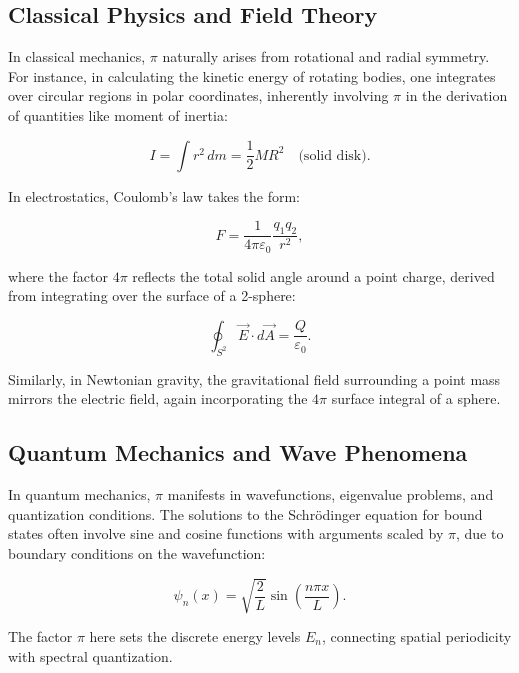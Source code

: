 \documentclass[12pt,a4paper]{article}
\begin{document}
\subsection{Classical Physics and Field Theory}

In classical mechanics, \(\pi\) naturally arises from rotational and radial symmetry. For instance, in calculating the kinetic energy of rotating bodies, one integrates over circular regions in polar coordinates, inherently involving \(\pi\) in the derivation of quantities like moment of inertia:

\begin{equation}
I = \int r^2 \, dm = \frac{1}{2} M R^2 \quad \text{(solid disk)}.
\end{equation}

In electrostatics, Coulomb’s law takes the form:

\begin{equation}
F = \frac{1}{4\pi \varepsilon_0} \frac{q_1 q_2}{r^2},
\end{equation}

where the factor \(4\pi\) reflects the total solid angle around a point charge, derived from integrating over the surface of a 2-sphere:

\begin{equation}
\oint_{S^2} \vec{E} \cdot d\vec{A} = \frac{Q}{\varepsilon_0}.
\end{equation}

Similarly, in Newtonian gravity, the gravitational field surrounding a point mass mirrors the electric field, again incorporating the \(4\pi\) surface integral of a sphere.

\subsection{Quantum Mechanics and Wave Phenomena}

In quantum mechanics, \(\pi\) manifests in wavefunctions, eigenvalue problems, and quantization conditions. The solutions to the Schrödinger equation for bound states often involve sine and cosine functions with arguments scaled by \(\pi\), due to boundary conditions on the wavefunction:

\begin{equation}
\psi_n(x) = \sqrt{\frac{2}{L}} \sin\left(\frac{n \pi x}{L}\right).
\end{equation}

The factor \(\pi\) here sets the discrete energy levels \(E_n\), connecting spatial periodicity with spectral quantization.
\end{document}
